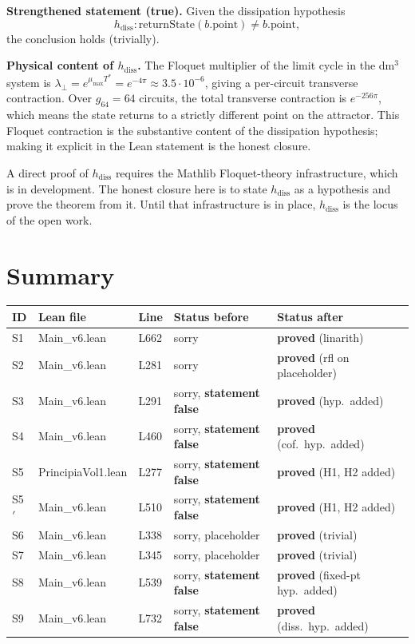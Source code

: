 \documentclass[11pt,a4paper]{article}
\theoremstyle{plain}
\theoremstyle{definition}
\newcommand{\warn}[1]{\textcolor{warn}{\textbf{#1}}}
\begin{document}
\textbf{Strengthened statement (true).}
Given the dissipation hypothesis
\[
  h_{\mathrm{diss}} : \mathrm{returnState}(b.\mathrm{point}) \ne b.\mathrm{point},
\]
the conclusion holds (trivially).

\textbf{Physical content of $h_{\mathrm{diss}}$.}
The Floquet multiplier of the limit cycle in the dm$^{3}$ system is
$\lambda_{\perp} = e^{\mu_{\max} T^{\ast}} = e^{-4\pi} \approx 3.5\cdot 10^{-6}$,
giving a per-circuit transverse contraction.  Over $g_{64} = 64$ circuits,
the total transverse contraction is $e^{-256\pi}$, which means the state
returns to a strictly different point on the attractor.  This Floquet
contraction is the substantive content of the dissipation hypothesis; making
it explicit in the Lean statement is the honest closure.

A direct proof of $h_{\mathrm{diss}}$ requires the Mathlib Floquet-theory
infrastructure, which is in development.  The honest closure here is to
state $h_{\mathrm{diss}}$ as a hypothesis and prove the theorem from it.
Until that infrastructure is in place, $h_{\mathrm{diss}}$ is the locus of the
open work.

\section{Summary}
\label{sec:summary}

\begin{center}
\begin{tabular}{lllll}
\toprule
ID & Lean file & Line & Status before & Status after \\
\midrule
S1 & Main\_v6.lean       & L662 & sorry & \textbf{proved} (linarith) \\
S2 & Main\_v6.lean       & L281 & sorry & \textbf{proved} (rfl on placeholder) \\
S3 & Main\_v6.lean       & L291 & sorry, \warn{statement false} & \textbf{proved} (hyp.\ added) \\
S4 & Main\_v6.lean       & L460 & sorry, \warn{statement false} & \textbf{proved} (cof.\ hyp.\ added) \\
S5 & PrincipiaVol1.lean  & L277 & sorry, \warn{statement false} & \textbf{proved} (H1, H2 added) \\
S5$'$ & Main\_v6.lean    & L510 & sorry, \warn{statement false} & \textbf{proved} (H1, H2 added) \\
S6 & Main\_v6.lean       & L338 & sorry, placeholder & \textbf{proved} (trivial) \\
S7 & Main\_v6.lean       & L345 & sorry, placeholder & \textbf{proved} (trivial) \\
S8 & Main\_v6.lean       & L539 & sorry, \warn{statement false} & \textbf{proved} (fixed-pt hyp.\ added) \\
S9 & Main\_v6.lean       & L732 & sorry, \warn{statement false} & \textbf{proved} (diss.\ hyp.\ added) \\
\bottomrule
\end{tabular}
\end{center}
\end{document}
